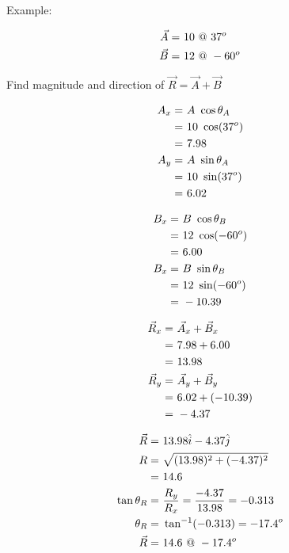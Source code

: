 	Example:

	\begin{align}
		\vec{A} = \ &10 \ @ \ 37^{o}& \notag \\
		\vec{B} = \ &12 \ @ \ -60^{o}& \notag
	\end{align}

	Find magnitude and direction of $\vec{R} = \vec{A} + \vec{B}$

	\begin{align}
		A_{x} = \ &A \ \cos \theta_{A}& \notag \\
		= \ &10 \ \cos (37^{o})& \notag \\
		= \ &7.98& \notag \\
		A_{y} = \ &A \ \sin \theta_{A}& \notag \\
		= \ &10 \ \sin (37^{o})& \notag \\
		= \ &6.02& \notag
	\end{align}

	\begin{align}
		B_{x} = \ &B \ \cos \theta_{B}& \notag \\
		= \ &12 \ \cos (-60^{o})& \notag \\
		= \ &6.00& \notag \\
		B_{x} = \ &B \ \sin \theta_{B}& \notag \\
		= \ &12 \ \sin (-60^{o})& \notag \\
		= \ &-10.39& \notag
	\end{align}

	\begin{align}
		\vec{R}_{x} = \ &\vec{A}_{x} + \vec{B}_{x}& \notag \\
		= \ &7.98 + 6.00& \notag \\
		= \ &13.98& \notag \\
		\vec{R}_{y} = \ &\vec{A}_{y} + \vec{B}_{y}& \notag \\
		= \ &6.02 + (-10.39)& \notag \\
		= \ &-4.37& \notag \\
	\end{align}

	\begin{align}
		\vec{R} = \ &13.98\hat{i} - 4.37\hat{j}& \notag \\
		R = \ &\sqrt{(13.98)^{2} + (-4.37)^{2}}& \notag \\
		= \ &14.6& \notag \\
		\tan \theta_{R} = \ &\frac{R_{y}}{R_{x}} = \frac{-4.37}{13.98} = -0.313& \notag \\
		\theta_{R} = \ &\tan^{-1} (-0.313) = -17.4^{o}& \notag \\
		\vec{R} = \ &14.6 \ @ \ -17.4^{o}& \notag \\
	\end{align}

